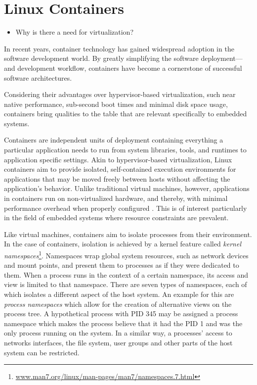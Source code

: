 
\section{Linux Containers}

\begin{itemize}
	\item Why is there a need for virtualization?
\end{itemize}

In recent years, container technology has gained widespread adoption in the software development world. By greatly simplifying the software deployment— and development workflow, containers have become a cornerstone of successful software architectures.


Considering their advantages over hypervisor-based virtualization, such near native performance, sub-second boot times \cite{felter2015updated,morabito2015hypervisors} and minimal disk space usage, containers bring qualities to the table that are relevant specifically to embedded systems.

Containers are independent units of deployment containing everything a particular application needs to run from system libraries, tools, and runtimes to application specific settings. 
Akin to hypervisor-based virtualization, Linux containers aim to provide isolated, self-contained execution environments for applications that may be moved freely between hosts without affecting the application's behavior.
Unlike traditional virtual machines, however, applications in containers run on non-virtualized hardware, and thereby, with minimal performance overhead when properly configured \cite{felter2015updated,morabito2015hypervisors}. This is of interest particularly in the field of embedded systems where resource constraints are prevalent.

Like virtual machines, containers aim to isolate processes from their environment. In the case of containers, isolation is achieved by a kernel feature called \emph{kernel namespaces}\footnote{\url{www.man7.org/linux/man-pages/man7/namespaces.7.html}}. Namespaces wrap global system resources, such as network devices and mount points, and present them to processes as if they were dedicated to them. 
When a process runs in the context of a certain namespace, its access and view is limited to that namespace. 
There are seven types of namespaces, each of which isolates a different aspect of the host system. 
An example for this are \emph{process namespaces} which allow for the creation of alternative views on the process tree. A hypothetical process with PID 345 may be assigned a process namespace which makes the process believe that it had the PID 1 and was the only process running on the system. 
In a similar way, a processes' access to networks interfaces, the file system, user groups and other parts of the host system can be restricted.

